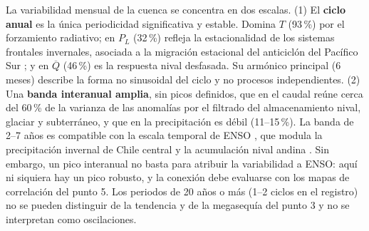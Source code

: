 \documentclass[11pt,letterpaper]{article}
\begin{document}
La variabilidad mensual de la cuenca se concentra en dos escalas. (1) El \textbf{ciclo anual} es la única
periodicidad significativa y estable. Domina $T$ (93\,\%) por el forzamiento radiativo; en $P_L$ (32\,\%) refleja
la estacionalidad de los sistemas frontales invernales, asociada a la migración estacional del anticiclón del
Pacífico Sur \citep{Garreaud2009}; y en $\overline{Q}$ (46\,\%) es la respuesta nival desfasada. Su armónico principal (6 meses) describe la forma no sinusoidal del ciclo y no procesos independientes. (2) Una \textbf{banda
interanual amplia}, sin picos definidos, que en el caudal reúne cerca del 60\,\% de la varianza de las
anomalías por el filtrado del almacenamiento nival, glaciar y subterráneo, y que en la precipitación es débil
(11--15\,\%). La banda de 2--7 años es compatible con la escala temporal de ENSO \citep{Trenberth1997}, que modula
la precipitación invernal de Chile central \citep{Montecinos2003} y la acumulación nival andina
\citep{Masiokas2006}. Sin embargo, un pico interanual no basta para atribuir la variabilidad a ENSO: aquí ni
siquiera hay un pico robusto, y la conexión debe evaluarse con los mapas de correlación del punto 5. Los
periodos de 20 años o más (1--2 ciclos en el registro) no se pueden distinguir de la tendencia y de la
megasequía del punto 3 y no se interpretan como oscilaciones.
\end{document}
